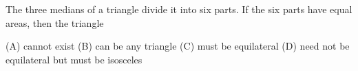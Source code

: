 The three medians of a triangle divide it into six parts. If the six parts have equal areas, then the triangle

(A) cannot exist \quad (B) can be any triangle \quad (C) must be equilateral \quad (D) need not be equilateral but must be isosceles
